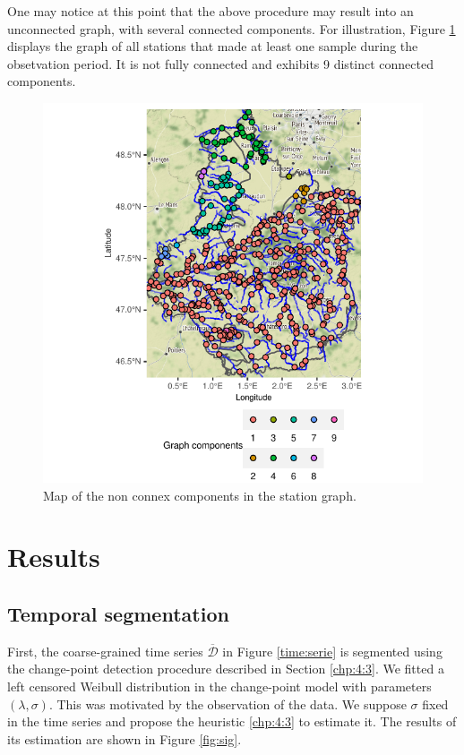 One may notice at this point that the above procedure may result into an unconnected graph, with several connected components. For illustration, Figure \ref{fig:comp} displays the graph of all stations that made at least one sample during the obsetvation period. It is not fully connected and exhibits 9 distinct connected components.  

\begin{figure}[htbp]
  \centering
  \includegraphics[]{figs/Chap5/Graph_comp-1.pdf}
  \caption{Map of the non connex components in the station graph.}
  \label{fig:comp}
\end{figure}

\section{Results}\label{section:results}

\subsection{Temporal segmentation}\label{sec:time_pattern}

First, the coarse-grained time series $\overline{\mathcal{D}}$ in Figure \ref{time:serie} is segmented using the change-point detection procedure described in Section \ref{chp:4:3}. We fitted a left censored Weibull distribution in the change-point model with parameters $(\lambda,\sigma)$. This was motivated by the observation of the data. We suppose $\sigma$ fixed in the time series and propose the heuristic \ref{chp:4:3} to estimate it. The results of its estimation are shown in Figure \ref{fig:sig}.

